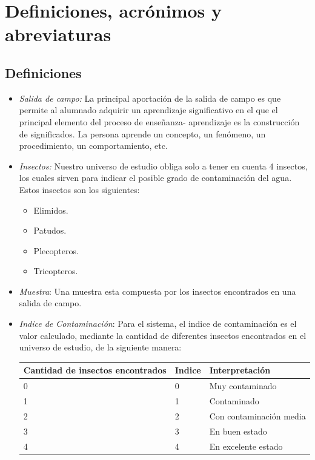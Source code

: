   \section{Definiciones, acrónimos y abreviaturas}

    \subsection{Definiciones}
      \begin{itemize}
        
        \item \emph{Salida de campo:} La principal aportación de la salida de campo es que permite al alumnado adquirir un aprendizaje significativo en el que el principal elemento del proceso de enseñanza- aprendizaje es la construcción de significados. La persona aprende un concepto, un fenómeno, un procedimiento, un comportamiento, etc.
        
        \item \emph{Insectos:} Nuestro universo de estudio obliga solo a tener en cuenta 4 insectos, los cuales sirven para indicar el posible grado de contaminación del agua. Estos insectos son los siguientes:
        
        \begin{itemize}
          \item Elimidos.
          \item Patudos.
          \item Plecopteros.
          \item Tricopteros.
        \end{itemize}
        
        \item \emph{Muestra}: Una muestra esta compuesta por los insectos encontrados en una salida de campo. 
        
        \item \emph{Indice de Contaminación}: Para el sistema, el indice de contaminación es el valor calculado, mediante la cantidad de diferentes insectos encontrados en el universo de estudio, de la siguiente manera:
        
        \begin{table}[H]
          \centering
          \begin{tabular}{|p{3.8cm}|l|l|}
            \hline
            \centering
            Cantidad de insectos encontrados  & Indice & Interpretación \\ \hline 
            0                     & 0 & Muy contaminado \\ \hline
            1                     & 1 & Contaminado \\ \hline
            2                     & 2 & Con contaminación media \\ \hline
            3                     & 3 & En buen estado \\ \hline
            4                     & 4 & En excelente estado \\ 
            \hline
          \end{tabular}
        \end{table}
        

\end{itemize}

